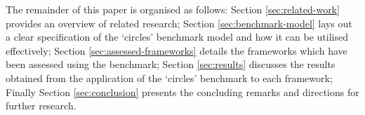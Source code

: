   The remainder of this paper is organised as follows: Section \ref{sec:related-work} provides an overview of related research; Section \ref{sec:benchmark-model} lays out a clear specification of the `circles' benchmark model and how it can be utilised effectively; Section \ref{sec:assessed-frameworks} details the frameworks which have been assessed using the benchmark; Section \ref{sec:results} discusses the results obtained from the application of the `circles' benchmark to each framework; Finally Section \ref{sec:conclusion} presents the concluding remarks and directions for further research.

